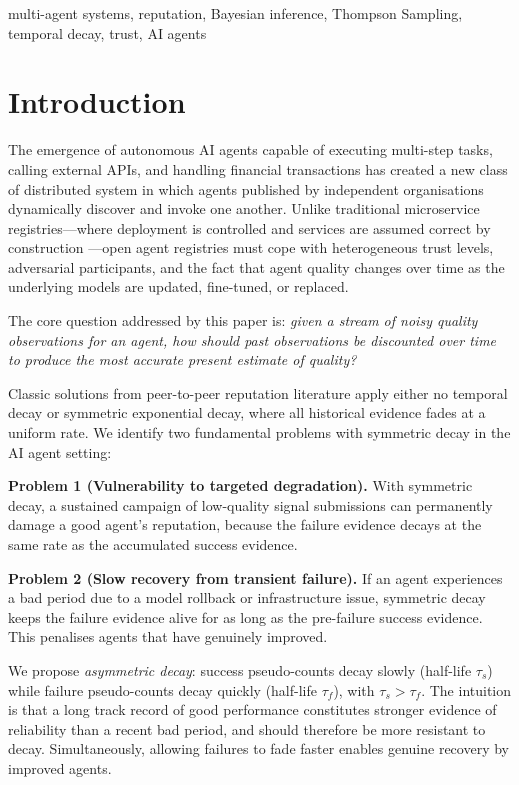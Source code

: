 \documentclass[conference]{IEEEtran}
\begin{document}
\begin{IEEEkeywords}
multi-agent systems, reputation, Bayesian inference, Thompson
Sampling, temporal decay, trust, AI agents
\end{IEEEkeywords}

\section{Introduction}
\label{sec:intro}

The emergence of autonomous AI agents capable of executing
multi-step tasks, calling external APIs, and handling
financial transactions has created a new class of distributed
system in which agents published by independent organisations
dynamically discover and invoke one another.
Unlike traditional microservice registries—where deployment
is controlled and services are assumed correct by construction
—open agent registries must cope with heterogeneous trust
levels, adversarial participants, and the fact that agent
quality changes over time as the underlying models are
updated, fine-tuned, or replaced.

The core question addressed by this paper is: \emph{given a
stream of noisy quality observations for an agent, how should
past observations be discounted over time to produce the most
accurate present estimate of quality?}

Classic solutions from peer-to-peer reputation literature
\cite{josang2002beta,kamvar2003eigentrust} apply either no
temporal decay or symmetric exponential decay, where all
historical evidence fades at a uniform rate. We identify two
fundamental problems with symmetric decay in the AI agent
setting:

\textbf{Problem 1 (Vulnerability to targeted degradation).}
With symmetric decay, a sustained campaign of low-quality
signal submissions can permanently damage a good agent's
reputation, because the failure evidence decays at the same
rate as the accumulated success evidence.

\textbf{Problem 2 (Slow recovery from transient failure).}
If an agent experiences a bad period due to a model rollback
or infrastructure issue, symmetric decay keeps the failure
evidence alive for as long as the pre-failure success
evidence. This penalises agents that have genuinely improved.

We propose \emph{asymmetric decay}: success pseudo-counts
decay slowly (half-life $\tau_s$) while failure pseudo-counts
decay quickly (half-life $\tau_f$), with $\tau_s > \tau_f$.
The intuition is that a long track record of good performance
constitutes stronger evidence of reliability than a recent
bad period, and should therefore be more resistant to decay.
Simultaneously, allowing failures to fade faster enables
genuine recovery by improved agents.
\end{document}
